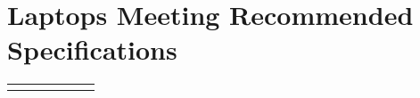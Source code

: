 \documentclass[14pt, letterpaper,twoside]{extreport}
\begin{document}
\pagebreak
\hypertarget{laptops-meeting-redcommended-specifications}{%
	\section*{Laptops Meeting Recommended
	  Specifications}\label{laptops-meeting-redcommended-specifications}}


\begin{longtable}[]{@{}
	>{\raggedright\arraybackslash}p{}
	>{\raggedright\arraybackslash}p{}
	>{\raggedright\arraybackslash}p{}
	>{\raggedright\arraybackslash}p{}
	>{\raggedright\arraybackslash}p{}
	>{\raggedright\arraybackslash}p{}
	>{\raggedright\arraybackslash}p{}@{}
	}
	\toprule\noalign{}


\end{longtable}
\end{document}

